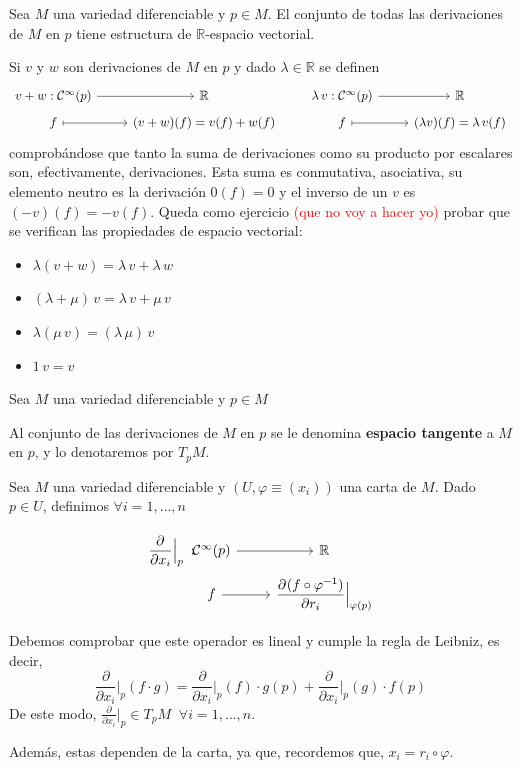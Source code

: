 \begin{prop}
Sea $M$ una variedad  diferenciable y $p \in M$. El conjunto de todas las derivaciones de $M$ en $p$ tiene estructura de $\mathbb{R}$-espacio vectorial.
\end{prop}
\begin{dem}
Si $v$ y $w$ son derivaciones de $M$ en $p$ y dado $\lambda \in \mathbb{R}$ se definen $$\begin{tikzcd}
v + w : \mathcal{C}^{\infty}(p) \rar & \mathbb{R}\\[-5mm]
f \arrow[mapsto]{r} & (v+w)(f) = v(f) + w(f)
\end{tikzcd} \qquad \begin{tikzcd}
\lambda\,v : \mathcal{C}^{\infty}(p) \rar & \mathbb{R}\\[-5mm]
f \arrow[mapsto]{r} & (\lambda v)(f) = \lambda\,v(f)
\end{tikzcd}$$
comprobándose que tanto la suma de derivaciones como su producto por escalares son, efectivamente, derivaciones. Esta suma es conmutativa, asociativa, su elemento neutro es la derivación $0(f) = 0$ y el inverso de un $v$ es $(-v)(f)=-v(f)$. Queda como ejercicio \textcolor{red}{(que no voy a hacer yo)} probar que se verifican las propiedades de espacio vectorial:
\begin{itemize}
    \item $\lambda (v + w) = \lambda\,v  + \lambda\,w$
    \item $(\lambda + \mu)\,v = \lambda\,v + \mu\,v$
    \item $\lambda(\mu\,v) = (\lambda \,\mu)\,v$
    \item $1\,v = v$
\end{itemize}
\end{dem}

Sea $M$ una variedad diferenciable y $p \in M$
\begin{defi}
Al conjunto de las derivaciones de $M$ en $p$ se le denomina \textbf{espacio tangente} a $M$ en $p$, y lo denotaremos por $T_pM$.
\end{defi}

\begin{ejem}
Sea $M$ una variedad diferenciable y $(U,\varphi\equiv (x_i))$ una carta de $M$. Dado $p\in U$, definimos $\forall i = 1, \ldots, n$

$$\begin{tikzcd}
\pd{}{x_i} {\Big|_p} \: : \hspace{-12mm} & \mathcal{C}^{\infty}(p) \arrow{r} & \mathbb{R}\\[-6mm]
& f \arrow{r}& \pd{(f \circ \varphi^{-1})}{r_i}{\Big|_{\varphi(p)}}
\end{tikzcd}$$

Debemos comprobar que este operador es lineal y cumple la regla de Leibniz, es decir, $${\frac{\partial}{\partial x_i}} {\Big|_p} (f \cdot g) = {\frac{\partial}{\partial x_i}} {\Big|_p} (f) \cdot g(p) + {\frac{\partial}{\partial x_i}} {\Big|_p} (g) \cdot f(p)$$
De este modo, ${\frac{\partial}{\partial x_i}} {\big|_p} \in T_pM \;\; \forall i = 1, \dots, n$.

Adem\'as, estas dependen de la carta, ya que, recordemos que, $x_i = r_i \circ \varphi$.
\end{ejem}

